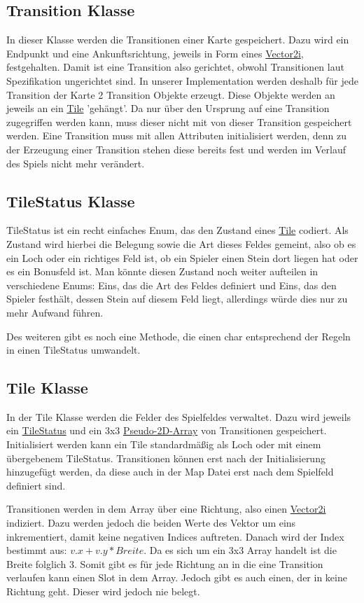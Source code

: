 \subsection{Transition Klasse}
\label{subsec:Transition}
In dieser Klasse werden die Transitionen einer Karte gespeichert. Dazu wird ein Endpunkt und eine Ankunftsrichtung, jeweils in Form eines \hyperref[subsec:Vector2i]{Vector2i}, festgehalten. Damit ist eine Transition also gerichtet, obwohl Transitionen laut Spezifikation ungerichtet sind. In unserer Implementation werden deshalb für jede Transition der Karte 2 Transition Objekte erzeugt. Diese Objekte werden an jeweils an ein \hyperref[subsec:Tile]{Tile} 'gehängt'. Da nur über den Ursprung auf eine Transition zugegriffen werden kann, muss dieser nicht mit von dieser Transition gespeichert werden. Eine Transition muss mit allen Attributen initialisiert werden, denn zu der Erzeugung einer Transition stehen diese bereits fest und werden im Verlauf des Spiels nicht mehr verändert.
\subsection{TileStatus Klasse}
\label{subsec:TileStatus}
TileStatus ist ein recht einfaches Enum, das den Zustand eines \hyperref[subsec:Tile]{Tile} codiert. Als Zustand wird hierbei die Belegung sowie die Art dieses Feldes gemeint, also ob es ein Loch oder ein richtiges Feld ist, ob ein Spieler einen Stein dort liegen hat oder es ein Bonusfeld ist. Man könnte diesen Zustand noch weiter aufteilen in verschiedene Enums: Eins, das die Art des Feldes definiert und Eins, das den Spieler festhält, dessen Stein auf diesem Feld liegt, allerdings würde dies nur zu mehr Aufwand führen.

Des weiteren gibt es noch eine Methode, die einen char entsprechend der Regeln in einen TileStatus umwandelt.
\subsection{Tile Klasse}
\label{subsec:Tile}
In der Tile Klasse werden die Felder des Spielfeldes verwaltet. Dazu wird jeweils ein \hyperref[subsec:TileStatus]{TileStatus} und ein 3x3 \hyperref[subsec:PseudoArr]{Pseudo-2D-Array} von Transitionen gespeichert.
Initialisiert werden kann ein Tile standardmäßig als Loch oder mit einem übergebenem TileStatus. Transitionen können erst nach der Initialisierung hinzugefügt werden, da diese auch in der Map Datei erst nach dem Spielfeld definiert sind.

Transitionen werden in dem Array über eine Richtung, also einen \hyperref[subsec:Vector2i]{Vector2i} indiziert. Dazu werden jedoch die beiden Werte des Vektor um eins inkrementiert, damit keine negativen Indices auftreten. Danach wird der Index bestimmt aus: $v.x+v.y*Breite$. Da es sich um ein 3x3 Array handelt ist die Breite folglich 3.
Somit gibt es für jede Richtung an in die eine Transition verlaufen kann einen Slot in dem Array. Jedoch gibt es auch einen, der in keine Richtung geht. Dieser wird jedoch nie belegt.

